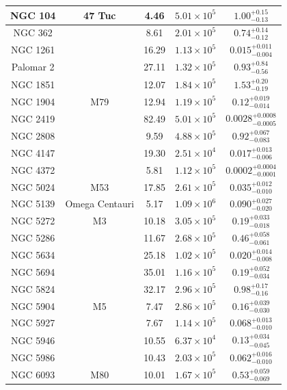 \begin{longtable}{|c|c|c|c|c|}
NGC 104 & 47 Tuc & 4.46 & $5.01\times 10^{5}$ & $1.00_{-0.13}^{+0.15}$ \\
\hline
NGC 362 &  & 8.61 & $2.01\times 10^{5}$ & $0.74_{-0.12}^{+0.14}$ \\
\hline
NGC 1261 &  & 16.29 & $1.13\times 10^{5}$ & $0.015_{-0.004}^{+0.011 }$ \\
\hline
Palomar 2 &  & 27.11 & $1.32\times 10^{5}$ & $0.93_{-0.56}^{+0.84 }$ \\
\hline
NGC 1851 &  & 12.07 & $1.84\times 10^{5}$ & $1.53_{-0.19}^{+0.20 }$ \\
\hline
NGC 1904 & M79 & 12.94 & $1.19\times 10^{5}$ & $0.12_{-0.014}^{+0.019 }$ \\
\hline
NGC 2419 &  & 82.49 & $5.01\times 10^{5}$ & $0.0028^{+0.0008}_{-0.0005}$ \\
\hline
NGC 2808 &  & 9.59 & $4.88\times 10^{5}$ & $0.92_{-0.083}^{+0.067 }$ \\
\hline
NGC 4147 &  & 19.30 & $2.51\times 10^{4}$ & $0.017_{-0.006}^{+0.013}$ \\
\hline
NGC 4372 &  & 5.81 & $1.12\times 10^{5}$ & $0.0002^{+0.0004}_{-0.0001}$ \\
\hline
NGC 5024 & M53 & 17.85 & $2.61\times 10^{5}$ & $0.035_{-0.010}^{+0.012 }$ \\
\hline
NGC 5139 & Omega Centauri & 5.17 & $1.09\times 10^{6}$ & $0.090_{-0.020}^{+0.027 }$ \\
\hline
NGC 5272 & M3 & 10.18 & $3.05\times 10^{5}$ & $0.19_{-0.018}^{+0.033 }$ \\
\hline
NGC 5286 &  & 11.67 & $2.68\times 10^{5}$ & $0.46_{-0.061}^{+0.058 }$ \\
\hline
NGC 5634 &  & 25.18 & $1.02\times 10^{5}$ & $0.020_{-0.008}^{+0.014 }$ \\
\hline
NGC 5694 &  & 35.01 & $1.16\times 10^{5}$ & $0.19_{-0.034}^{+0.052 }$ \\
\hline
NGC 5824 &  & 32.17 & $2.96\times 10^{5}$ & $0.98_{-0.16}^{+0.17 }$ \\
\hline
NGC 5904 & M5 & 7.47 & $2.86\times 10^{5}$ & $0.16_{-0.030}^{+0.039 }$ \\
\hline
NGC 5927 &  & 7.67 & $1.14\times 10^{5}$ & $0.068_{-0.010}^{+0.013 }$ \\
\hline
NGC 5946 &  & 10.55 & $6.37\times 10^{4}$ & $0.13_{-0.045}^{+0.034 }$ \\
\hline
NGC 5986 &  & 10.43 & $2.03\times 10^{5}$ & $0.062_{-0.010}^{+0.016 }$ \\
\hline
NGC 6093 & M80 & 10.01 & $1.67\times 10^{5}$ & $0.53_{-0.069}^{+0.059 }$ \\

\end{longtable}
